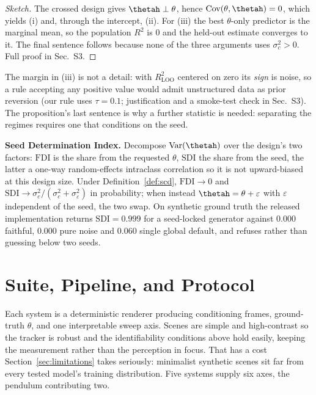 \documentclass[10pt,twocolumn,letterpaper]{article}
\begin{document}
\begin{proof}[Sketch]
The crossed design gives $\thetah\perp\theta$, hence
$\operatorname{Cov}(\theta,\thetah)=0$, which yields (i) and, through the
intercept, (ii). For (iii) the best $\theta$-only predictor is the marginal
mean, so the population $R^2$ is $0$ and the held-out estimate converges to
it. The final sentence follows because none of the three arguments uses
$\sigma_c^2>0$. Full proof in Sec.~S3.
\end{proof}

The margin in (iii) is not a detail: with $R^2_{\mathrm{LOO}}$ centered on
zero its \emph{sign} is noise, so a rule accepting any positive value would
admit unstructured data as prior reversion (our rule uses $\tau=0.1$;
justification and a smoke-test check in Sec.~S3). The proposition's last
sentence is why a further statistic is needed: separating the regimes
requires one that conditions on the seed.

\textbf{Seed Determination Index.}
Decompose $\operatorname{Var}(\thetah)$ over the design's two factors:
$\mathrm{FDI}$ is the share from the requested $\theta$, $\mathrm{SDI}$ the
share from the seed, the latter a one-way random-effects intraclass
correlation so it is not upward-biased at this design size. Under
Definition~\ref{def:scd}, $\mathrm{FDI}\to0$ and
$\mathrm{SDI}\to\sigma_c^2/(\sigma_c^2+\sigma_\varepsilon^2)$ in probability;
when instead $\thetah=\theta+\varepsilon$ with $\varepsilon$ independent of
the seed, the two swap. On synthetic ground truth the released implementation
returns $\mathrm{SDI}=0.999$ for a seed-locked generator against $0.000$
faithful, $0.000$ pure noise and $0.060$ single global default, and refuses
rather than guessing below two seeds.

\section{Suite, Pipeline, and Protocol}
\label{sec:suite}

Each system is a deterministic renderer producing conditioning frames,
ground-truth $\theta$, and one interpretable sweep axis. Scenes are simple
and high-contrast so the tracker is robust and the identifiability conditions
above hold easily, keeping the measurement rather than the perception in
focus.
That has a cost Section~\ref{sec:limitations} takes seriously: minimalist
synthetic scenes sit far from every tested model's training distribution.
Five systems supply six axes, the pendulum contributing two.
\end{document}
